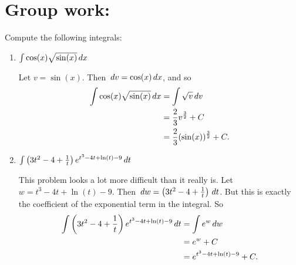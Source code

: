 \documentclass[nooutcomes]{ximera}
\begin{document}
		
		

	
	
	
	
	

\section*{Group work:}
















\begin{problem}
Compute the following integrals:

	\begin{enumerate}
	
	\item  $\int \cos(x) \sqrt{\sin(x)} \,d x$
		\begin{freeResponse}
		Let $v = \sin(x)$.  Then $\,d v = \cos(x) \,d x$, and so
			\begin{align*}
			\int \cos(x) \sqrt{\sin(x)} \,d x &= \int \sqrt{v} \,d v  \\
			&= \frac{2}{3} v^{\frac{3}{2}} + C  \\
			&= \frac{2}{3} (\sin(x))^{\frac{3}{2}} + C.
			\end{align*}
		\end{freeResponse}
		
		
		
	\item  $\int \left( 3t^2 - 4 + \frac{1}{t} \right) e^{t^3 - 4t + \ln(t) - 9} \,d t$
		\begin{freeResponse}
		This problem looks a lot more difficult than it really is.  Let $w=t^3 - 4t + \ln(t) - 9$.  
		Then $\,d w = \left( 3t^2 - 4 + \frac{1}{t} \right) \,d t$.  But this is exactly the coefficient of the exponential term in the integral.  So
			\begin{align*}
			\int \left( 3t^2 - 4 + \frac{1}{t} \right) e^{t^3 - 4t + \ln(t) - 9} \,d t &= \int e^w \,d w  \\
			&= e^w + C  \\
			&= e^{t^3 - 4t + \ln(t) - 9} + C.
			\end{align*}
		\end{freeResponse}
		
		
		
	\end{enumerate}
		
		
		

\end{problem}
	
\end{document}
